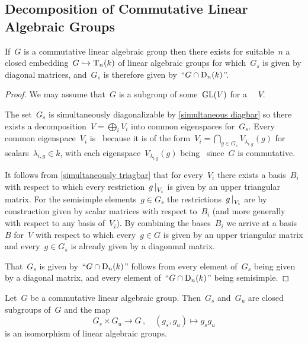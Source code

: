 \subsection{Decomposition of Commutative Linear Algebraic Groups}


\begin{corollary}
  \label{embedding for comm lag}
  If~$G$ is a commutative linear algebraic group then there exists for suitable~$n$ a closed embedding~$G \hookrightarrow \operatorname{T}_n(k)$ of linear algebraic groups for which~$G_s$ is given by diagonal matrices, and~$G_s$ is therefore given by~\enquote{$G \cap \operatorname{D}_n(k)$}.
\end{corollary}




\begin{proof}
  We may assume that~$G$ is a subgroup of some~$\operatorname{GL}(V)$ for a {\fd}~{\kvs}~$V$.
  
  The set~$G_s$ is simultaneously diagonalizable by \cref{simultaneous diagbar} so there exists a decomposition~$V = \bigoplus_i V_i$ into common eigenspaces for~$G_s$.
  Every common eigenspace~$V_i$ is~ because it is of the form~$V_i = \bigcap_{g \in G_s} V_{\lambda_{i,g}}(g)$ for scalars~$\lambda_{i,g} \in k$, with each eigenspace~$V_{\lambda_{i,g}}(g)$ being~ since~$G$ is commutative.
  
  It follows from \cref{simultaneously triagbar} that for every~$V_i$ there exists a basis~$B_i$ with respect to which every restriction~$\restrict{g}{V_i}$ is given by an upper triangular matrix.
  For the semisimple elements~$g \in G_s$ the restrictions~$\restrict{g}{V_i}$ are by construction given by scalar matrices with respect to~$B_i$ (and more generally with respect to any basis of~$V_i$).
  By combining the bases~$B_i$ we arrive at a basis~$B$ for~$V$ with respect to which every~$g \in G$ is given by an upper triangular matrix and every~$g \in G_s$ is already given by a diagonmal matrix.
  
  That~$G_s$ is given by~\enquote{$G \cap \operatorname{D}_n(k)$} follows from every element of~$G_s$ being given by a diagonal matrix, and every element of~\enquote{$G \cap \operatorname{D}_n(k)$} being semisimple.
\end{proof}


\begin{theorem}
  Let~$G$ be a commutative linear algebraic group.
  Then~$G_s$ and~$G_u$ are closed subgroups of~$G$ and the map
  \[
            G_s \times G_u
    \to     G \,,
    \quad   (g_s, g_u)
    \mapsto g_s g_u
  \]
  is an isomorphism of linear algebraic groups.
\end{theorem}


